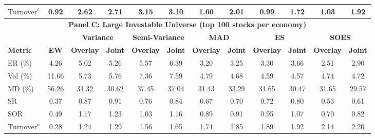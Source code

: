 \begin{table}[tbp]
{\begin{tabular}{l*{11}{c}}
    $\text{Turnover}^c$      & 0.92             & 2.62             & 2.71             & 3.15             & 3.10             & 1.60             & 2.01             & 0.99             & 1.72             & 1.03             & 1.92 \\
    \midrule
    \multicolumn{12}{c}{\textbf{Panel C: Large Investable Universe (top 100 stocks per economy)}} \\
    \midrule
                             &                  & \multicolumn{2}{c}{\textbf{Variance}} & \multicolumn{2}{c}{\textbf{Semi-Variance}} & \multicolumn{2}{c}{\textbf{MAD}} & \multicolumn{2}{c}{\textbf{ES}} & \multicolumn{2}{c}{\textbf{SOES}} \\
    \cmidrule(lr){3-4} \cmidrule(lr){5-6} \cmidrule(lr){7-8} \cmidrule(lr){9-10} \cmidrule(lr){11-12}
    \textbf{Metric}          & \textbf{EW}      & \textbf{Overlay} & \textbf{Joint}   & \textbf{Overlay} & \textbf{Joint}   & \textbf{Overlay} & \textbf{Joint}   & \textbf{Overlay} & \textbf{Joint}   & \textbf{Overlay} & \textbf{Joint} \\
    \midrule
    ER (\%)                  & 4.26             & 5.02             & 5.26             & 5.57             & 6.39             & 3.20             & 3.25             & 3.30             & 3.66             & 2.51             & 2.90 \\
    Vol (\%)                 & 11.66            & 5.73             & 5.76             & 7.36             & 7.59             & 4.79             & 4.68             & 4.59             & 4.57             & 4.74             & 4.72 \\
    MD (\%)                  & 56.26            & 31.32            & 30.62            & 37.45            & 37.04            & 31.43            & 33.29            & 31.65            & 30.47            & 31.65            & 29.57 \\
    SR                       & 0.37             & 0.87             & 0.91             & 0.76             & 0.84             & 0.67             & 0.70             & 0.72             & 0.80             & 0.53             & 0.61 \\
    SOR                      & 0.49             & 1.17             & 1.23             & 1.03             & 1.16             & 0.89             & 0.91             & 0.95             & 1.07             & 0.70             & 0.82 \\
    $\text{Turnover}^a$      & 0.28             & 1.24             & 1.29             & 1.56             & 1.65             & 1.74             & 1.85             & 1.89             & 1.92             & 2.14             & 2.20 \\

\end{tabular}}
\end{table}
